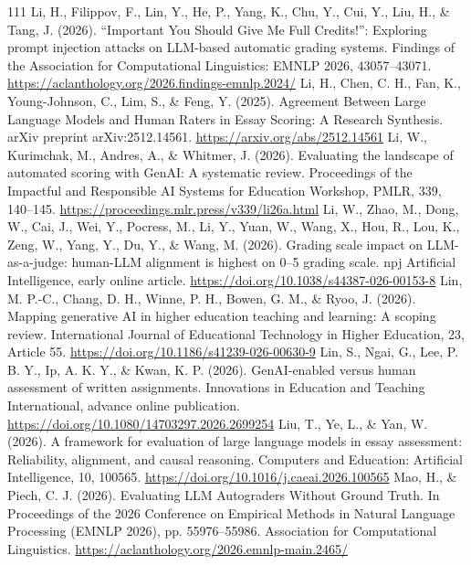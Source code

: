\begin{thebibliography}{111}
 Li, H., Filippov, F., Lin, Y., He, P., Yang, K., Chu, Y., Cui, Y., Liu, H., \& Tang, J. (2026). ``Important You Should Give Me Full Credits!'': Exploring prompt injection attacks on LLM-based automatic grading systems. Findings of the Association for Computational Linguistics: EMNLP 2026, 43057--43071. \url{https://aclanthology.org/2026.findings-emnlp.2024/}
 Li, H., Chen, C. H., Fan, K., Young-Johnson, C., Lim, S., \& Feng, Y. (2025). Agreement Between Large Language Models and Human Raters in Essay Scoring: A Research Synthesis. arXiv preprint arXiv:2512.14561. \url{https://arxiv.org/abs/2512.14561}
 Li, W., Kurimchak, M., Andres, A., \& Whitmer, J. (2026). Evaluating the landscape of automated scoring with GenAI: A systematic review. Proceedings of the Impactful and Responsible AI Systems for Education Workshop, PMLR, 339, 140--145. \url{https://proceedings.mlr.press/v339/li26a.html}
 Li, W., Zhao, M., Dong, W., Cai, J., Wei, Y., Pocress, M., Li, Y., Yuan, W., Wang, X., Hou, R., Lou, K., Zeng, W., Yang, Y., Du, Y., \& Wang, M. (2026). Grading scale impact on LLM-as-a-judge: human-LLM alignment is highest on 0--5 grading scale. npj Artificial Intelligence, early online article. \url{https://doi.org/10.1038/s44387-026-00153-8}
 Lin, M. P.-C., Chang, D. H., Winne, P. H., Bowen, G. M., \& Ryoo, J. (2026). Mapping generative AI in higher education teaching and learning: A scoping review. International Journal of Educational Technology in Higher Education, 23, Article 55. \url{https://doi.org/10.1186/s41239-026-00630-9}
 Lin, S., Ngai, G., Lee, P. B. Y., Ip, A. K. Y., \& Kwan, K. P. (2026). GenAI-enabled versus human assessment of written assignments. Innovations in Education and Teaching International, advance online publication. \url{https://doi.org/10.1080/14703297.2026.2699254}
 Liu, T., Ye, L., \& Yan, W. (2026). A framework for evaluation of large language models in essay assessment: Reliability, alignment, and causal reasoning. Computers and Education: Artificial Intelligence, 10, 100565. \url{https://doi.org/10.1016/j.caeai.2026.100565}
 Mao, H., \& Piech, C. J. (2026). Evaluating LLM Autograders Without Ground Truth. In Proceedings of the 2026 Conference on Empirical Methods in Natural Language Processing (EMNLP 2026), pp. 55976--55986. Association for Computational Linguistics. \url{https://aclanthology.org/2026.emnlp-main.2465/}

\end{thebibliography}
